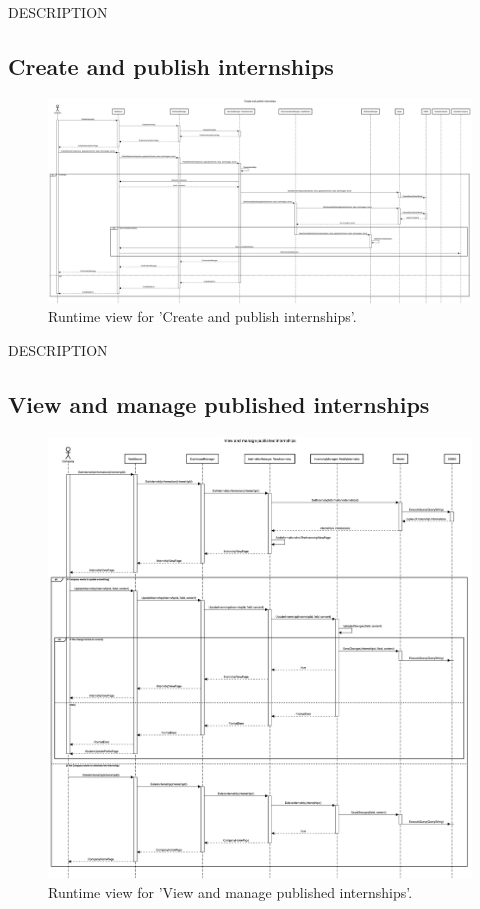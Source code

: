 DESCRIPTION


\subsection{Create and publish internships}
\begin{figure}[H]
    \begin{center}
        \includegraphics[width=0.8\linewidth]{DD/LaTeX/Images/RuntimeView/PublishInternship.png}
        \caption{Runtime view for 'Create and publish internships'.}
        \label{fig:runtime_PublishInternship}%
    \end{center}
\end{figure}

DESCRIPTION


\subsection{View and manage published internships}
\begin{figure}[H]
    \begin{center}
        \includegraphics[width=0.8\linewidth]{DD/LaTeX/Images/RuntimeView/ManageInternships.png}
        \caption{Runtime view for 'View and manage published internships'.}
        \label{fig:runtime_ManageInternships}%
    \end{center}
\end{figure}

